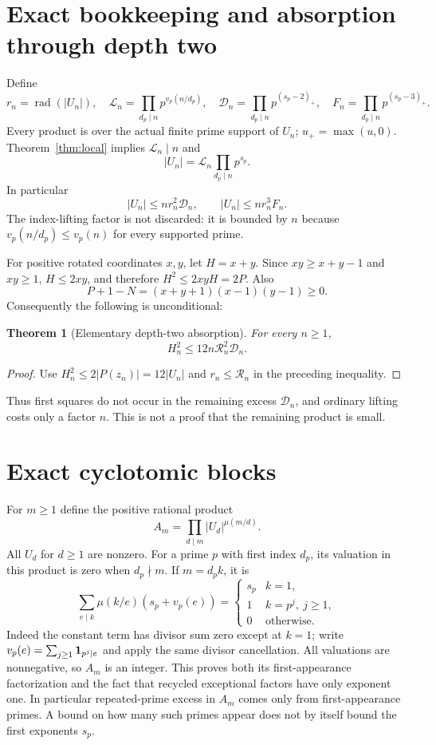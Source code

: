 \documentclass[11pt]{amsart}
\newtheorem{theorem}{Theorem}[section]
\theoremstyle{definition}\newtheorem{definition}[theorem]{Definition}
\theoremstyle{remark}\newtheorem{remark}[theorem]{Remark}
\newcommand{\rad}{\operatorname{rad}}\newcommand{\eps}{\varepsilon}
\begin{document}
\section{Exact bookkeeping and absorption through depth two}
Define
\[
 r_n=\rad(|U_n|),\quad
 \mathcal L_n=\prod_{d_p\mid n}p^{v_p(n/d_p)},\quad
 \mathcal D_n=\prod_{d_p\mid n}p^{(s_p-2)_+},\quad
 F_n=\prod_{d_p\mid n}p^{(s_p-3)_+}.
\]
Every product is over the actual finite prime support of $U_n$; $u_+=\max(u,0)$. Theorem~\ref{thm:local} implies $\mathcal L_n\mid n$ and
\[
 |U_n|=\mathcal L_n\prod_{d_p\mid n}p^{s_p}.
\]
In particular
\[
 |U_n|\le n r_n^2\mathcal D_n,\qquad
 |U_n|\le n r_n^3 F_n.
\]
The index-lifting factor is not discarded: it is bounded by $n$ because $v_p(n/d_p)\le v_p(n)$ for every supported prime.

For positive rotated coordinates $x,y$, let $H=x+y$. Since $xy\ge x+y-1$ and $xy\ge1$, $H\le2xy$, and therefore $H^2\le2xyH=2P$. Also
\[
 P+1-N=(x+y+1)(x-1)(y-1)\ge0.
\]
Consequently the following is unconditional:
\begin{theorem}[Elementary depth-two absorption]\label{thm:two}
For every $n\ge1$,
\[
 H_n^2\le12n\mathscr R_n^2\mathcal D_n.
\]
\end{theorem}
\begin{proof}
Use $H_n^2\le2|P(z_n)|=12|U_n|$ and $r_n\le\mathscr R_n$ in the preceding inequality.
\end{proof}
Thus first squares do not occur in the remaining excess $\mathcal D_n$, and ordinary lifting costs only a factor $n$. This is not a proof that the remaining product is small.

\section{Exact cyclotomic blocks}
For $m\ge1$ define the positive rational product
\[
 A_m=\prod_{d\mid m}|U_d|^{\mu(m/d)}.
\]
All $U_d$ for $d\ge1$ are nonzero. For a prime $p$ with first index $d_p$, its valuation in this product is zero when $d_p\nmid m$. If $m=d_p k$, it is
\[
 \sum_{e\mid k}\mu(k/e)(s_p+v_p(e))
 =\begin{cases}s_p&k=1,\\1&k=p^j,\ j\ge1,\\0&\text{otherwise}.\end{cases}
\]
Indeed the constant term has divisor sum zero except at $k=1$; write $v_p(e)=\sum_{j\ge1}{\bf1}_{p^j\mid e}$ and apply the same divisor cancellation. All valuations are nonnegative, so $A_m$ is an integer. This proves both its first-appearance factorization and the fact that recycled exceptional factors have only exponent one. In particular repeated-prime excess in $A_m$ comes only from first-appearance primes. A bound on how many such primes appear does not by itself bound the first exponents $s_p$.
\end{document}
